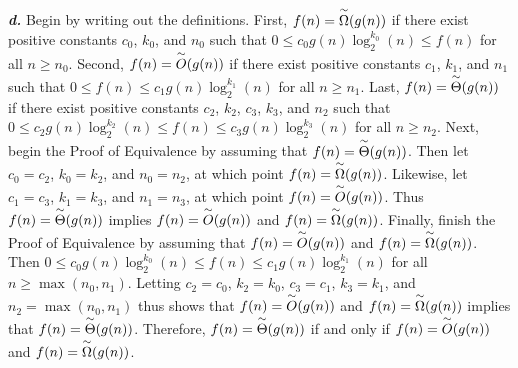 \noindent\textbf{\textit{d.}} Begin by writing out the definitions. First, $f(n) = \overset{\small\sim}{\Omega}(g(n))$ if there exist positive constants $c_0$, $k_0$, and $n_0$ such that $0 \leq c_0 g(n) \log_2^{k_0}(n) \leq f(n)$ for all $n \geq n_0$. Second, $f(n) = \overset{\small\sim}{O}(g(n))$ if there exist positive constants $c_1$, $k_1$, and $n_1$ such that $0 \leq f(n) \leq c_1 g(n) \log_2^{k_1}(n)$ for all $n \geq n_1$. Last, $f(n) = \overset{\small\sim}{\Theta}(g(n))$ if there exist positive constants $c_2$, $k_2$, $c_3$, $k_3$, and $n_2$ such that $0 \leq c_2 g(n) \log_2^{k_2}(n) \leq f(n) \leq c_3 g(n) \log_2^{k_3}(n)$ for all $n \geq n_2$. Next, begin the Proof of Equivalence by assuming that $f(n) = \overset{\small\sim}{\Theta}(g(n))$. Then let $c_0 = c_2$, $k_0 = k_2$, and $n_0 = n_2$, at which point $f(n) = \overset{\small\sim}{\Omega}(g(n))$. Likewise, let $c_1 = c_3$, $k_1 = k_3$, and $n_1 = n_3$, at which point $f(n) = \overset{\small\sim}{O}(g(n))$. Thus $f(n) = \overset{\small\sim}{\Theta}(g(n))$ implies $f(n) = \overset{\small\sim}{O}(g(n))$ and $f(n) = \overset{\small\sim}{\Omega}(g(n))$. Finally, finish the Proof of Equivalence by assuming that $f(n) = \overset{\small\sim}{O}(g(n))$ and $f(n) = \overset{\small\sim}{\Omega}(g(n))$. Then $0 \leq c_0 g(n) \log_2^{k_0}(n) \leq f(n) \leq c_1 g(n) \log_2^{k_1}(n)$ for all $n \geq \max(n_0, n_1)$. Letting $c_2 = c_0$, $k_2 = k_0$, $c_3 = c_1$, $k_3 = k_1$, and $n_2 = \max(n_0, n_1)$ thus shows that $f(n) = \overset{\small\sim}{O}(g(n))$ and $f(n) = \overset{\small\sim}{\Omega}(g(n))$ implies that $f(n) = \overset{\small\sim}{\Theta}(g(n))$. Therefore, $f(n) = \overset{\small\sim}{\Theta}(g(n))$ if and only if $f(n) = \overset{\small\sim}{O}(g(n))$ and $f(n) = \overset{\small\sim}{\Omega}(g(n))$.
